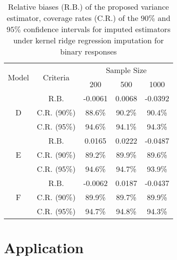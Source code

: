 \documentclass[12pt]{article}
\begin{document}
\begin{table}[!ht]
\centering
\caption{
Relative biases (R.B.)  of the proposed variance estimator, coverage rates (C.R.) of the $90\%$ and $95\%$ confidence intervals for imputed estimators under kernel ridge regression imputation 
for binary responses}\label{MAR, binary, KRR}
\begin{tabular}{ccccc}
  \hline
\multirow{2}{*}{Model} & \multirow{2}{*}{Criteria}  & \multicolumn{3}{c}{Sample Size} \\
  \cline{3-5} 
    &  &   200 & 500 & 1000 \\ 
  \hline
 \multirow{3}{*}{D} & R.B. & -0.0061 & 0.0068 & -0.0392 \\ 
 & C.R. (90\%)  & 88.6\% & 90.2\% & 90.4\% \\ 
 &  C.R. (95\%)  & 94.6\% & 94.1\% & 94.3\% \\ 
 \hline
\multirow{3}{*}{E} & R.B.  & 0.0165 & 0.0222 & -0.0487 \\ 
 &  C.R. (90\%)  & 89.2\% & 89.9\% & 89.6\% \\ 
 & C.R. (95\%)   & 94.6\% & 94.7\% & 93.9\% \\  
  \hline
 \multirow{3}{*}{F} &   R.B. & -0.0062 & 0.0187 & -0.0437 \\ 
 & C.R. (90\%)   & 89.9\% & 89.7\% & 89.9\% \\ 
 & C.R. (95\%)   & 94.7\% & 94.8\% & 94.3\% \\ 
 \hline
\end{tabular}
\end{table}




\section{Application} 
\end{document}
